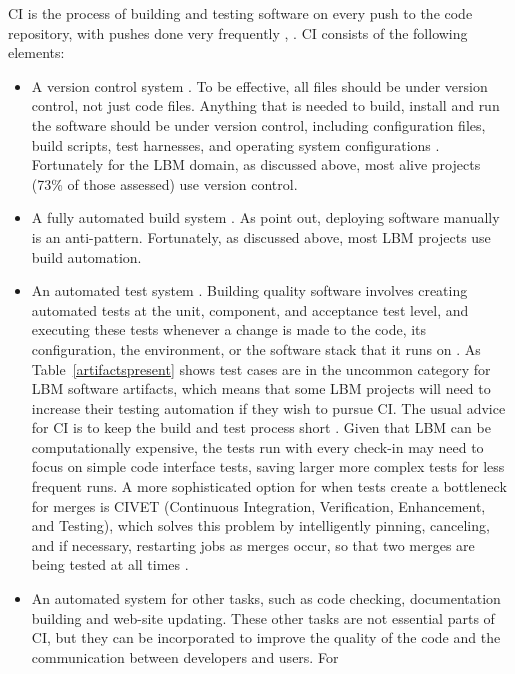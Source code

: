 \documentclass[final, 3p, times, authoryear]{elsarticle}
\begin{document}
CI is the process of building and testing software on every push to the code
repository, with pushes done very frequently \citep[p.\ 13]
{HumbleAndFarley2010}, \citep{ShahinEtAl2017, Fowler2006}.  CI consists of the
following elements:
\begin{itemize}
	\item A version control system \citep{Fowler2006}. To be effective, all
	files should be under version control, not just code files.  Anything that
	is needed to build, install and run the software should be under version
	control, including configuration files, build scripts, test harnesses, and
	operating system configurations \citep[p. 19]{HumbleAndFarley2010}.
	Fortunately for the LBM domain, as discussed above, most alive projects
	(73\% of those assessed) use version control.
	\item A fully automated build system \citep{Fowler2006}.  As \citet[p.\
	5]{HumbleAndFarley2010} point out, deploying software manually is an
	anti-pattern.  Fortunately, as discussed above, most LBM projects use build
	automation.
	\item An automated test system \citep{Fowler2006}. Building quality software
	involves creating automated tests at the unit, component, and acceptance
	test level, and executing these tests whenever a change is made to the code,
	its configuration, the environment, or the software stack that it runs on
	\citep[p.\ 83]{HumbleAndFarley2010}. As Table~\ref{artifactspresent} shows
	test cases are in the uncommon category for LBM software artifacts, which
	means that some LBM projects will need to increase their testing automation
	if they wish to pursue CI.  The usual advice for CI is to keep the build and
	test process short \citep[p.\ 60]{HumbleAndFarley2010}. Given that LBM can
	be computationally expensive, the tests run with every check-in may need to
	focus on simple code interface tests, saving larger more complex tests for
	less frequent runs.  A more sophisticated option for when tests create a
	bottleneck for merges is CIVET (Continuous Integration,
	Verification, Enhancement, and Testing), which solves this problem by
	intelligently pinning, canceling, and if necessary, restarting jobs as
	merges occur, so that two merges are being tested at all times
	\citep{SlaughterEtAl2021}.
	\item An automated system for other tasks, such as code checking,
	documentation building and web-site updating.  These other tasks are not
	essential parts of CI, but they can be incorporated to improve the quality
	of the code and the communication between developers and users. For

\end{itemize}
\end{document}
